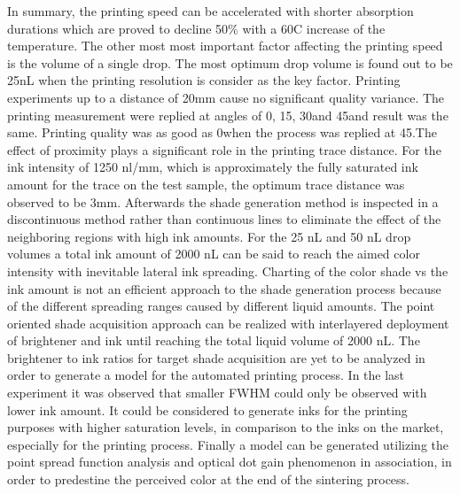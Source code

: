 In summary, the printing speed can be accelerated with shorter absorption durations which are proved to decline 50\% with a 60\textdegree C increase of the temperature. The other most most important factor affecting the printing speed is the volume of a single drop. The most optimum drop volume is found out to be 25nL when the printing resolution is consider as the key factor. Printing experiments up to a distance of 20mm cause no significant quality variance. The printing measurement were replied at angles of 0\textdegree \space, 15\textdegree \space, 30\textdegree \space and 45\textdegree \space and result was the same. Printing quality was as good as 0\textdegree \space  when the process was replied at 45\textdegree \space .The effect of proximity plays a significant role in the printing trace distance. For the ink intensity of 1250 nl/mm, which is approximately the fully saturated ink amount for the trace on the test sample, the optimum trace distance  was observed to be 3mm. Afterwards the shade generation method is inspected in a discontinuous method rather than continuous lines to eliminate the effect of the neighboring regions with high ink amounts. For the 25 nL and 50 nL drop volumes a total ink amount of 2000 nL can be said to reach the aimed color intensity with inevitable lateral ink spreading. Charting of the color shade vs the ink amount is not an efficient approach to the shade generation process because of the different spreading ranges caused by different liquid amounts. The point oriented shade acquisition approach can be realized with interlayered deployment of brightener and ink until reaching the total liquid volume of 2000 nL. The brightener to ink ratios for target shade acquisition are yet to be analyzed in order to generate a model for the automated printing process. In the last experiment it was observed that smaller FWHM could only be observed with lower ink amount. It could be considered to generate inks for the printing purposes with higher saturation levels, in comparison to the inks on the market, especially for the printing process. Finally a model can be generated utilizing the point spread function analysis and optical dot gain phenomenon in association, in order to predestine the perceived color at the end of the sintering process. 